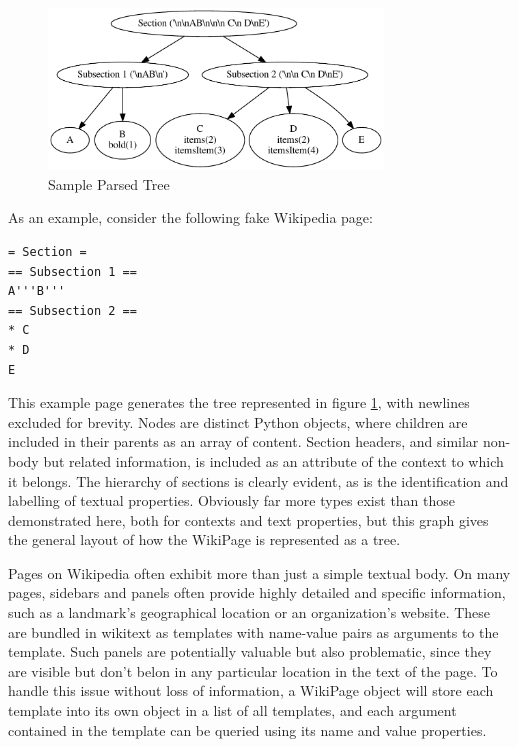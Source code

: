 \begin{figure}[!t]
\centering
\includegraphics[width=3.5in]{wikiparse_demo_graph}
\caption{Sample Parsed Tree}
\label{sampletree}
\end{figure}

As an example, consider the following fake Wikipedia page:
\begin{verbatim}
= Section =
== Subsection 1 ==
A'''B'''
== Subsection 2 ==
* C
* D
E
\end{verbatim}
This example page generates the tree represented in figure \ref{sampletree}, with newlines excluded for brevity. Nodes are distinct Python objects, where children are included in their parents as an array of content. Section headers, and similar non-body but related information, is included as an attribute of the context to which it belongs. The hierarchy of sections is clearly evident, as is the identification and labelling of textual properties. Obviously far more types exist than those demonstrated here, both for contexts and text properties, but this graph gives the general layout of how the WikiPage is represented as a tree.

Pages on Wikipedia often exhibit more than just a simple textual body. On many pages, sidebars and panels often provide highly detailed and specific information, such as a landmark's geographical location or an organization's website. These are bundled in wikitext as templates with name-value pairs as arguments to the template. Such panels are potentially valuable but also problematic, since they are visible but don't belon in any particular location in the text of the page. To handle this issue without loss of information, a WikiPage object will store each template into its own object in a list of all templates, and each argument contained in the template can be queried using its name and value properties.

